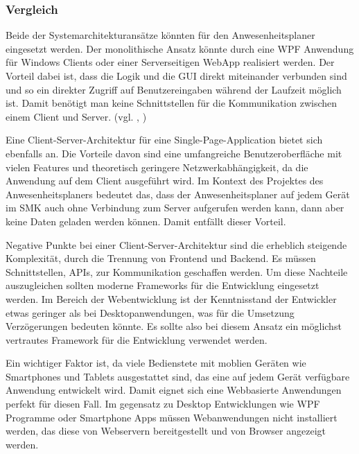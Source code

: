 \subsubsection{Vergleich}
\label{sec:Vergleich}
Beide der Systemarchitekturansätze könnten für den Anwesenheitsplaner eingesetzt werden. Der monolithische Ansatz könnte durch eine WPF Anwendung für Windows Clients oder einer Serverseitigen WebApp realisiert werden. Der Vorteil dabei ist, dass die Logik und die GUI direkt miteinander verbunden sind und so ein direkter Zugriff auf Benutzereingaben während der Laufzeit möglich ist. Damit benötigt man keine Schnittstellen für die Kommunikation zwischen einem Client und Server. (vgl. \cite{wpf}, \cite{modernApp})

Eine Client-Server-Architektur für eine Single-Page-Application bietet sich ebenfalls an. Die Vorteile davon sind eine umfangreiche Benutzeroberfläche mit vielen Features und theoretisch geringere Netzwerkabhängigkeit, da die Anwendung auf dem Client ausgeführt wird. Im Kontext des Projektes des Anwesenheitsplaners bedeutet das, dass der Anwesenheitsplaner auf jedem Gerät im SMK auch ohne Verbindung zum Server aufgerufen werden kann, dann aber keine Daten geladen werden können. Damit entfällt dieser Vorteil.

Negative Punkte bei einer Client-Server-Architektur sind die erheblich steigende Komplexität, durch die Trennung von Frontend und Backend. Es müssen Schnittstellen, \zB APIs, zur Kommunikation geschaffen werden. Um diese Nachteile auszugleichen sollten moderne Frameworks für die Entwicklung eingesetzt werden. Im Bereich der Webentwicklung ist der Kenntnisstand der Entwickler etwas geringer als bei Desktopanwendungen, was für die Umsetzung Verzögerungen bedeuten könnte. Es sollte also bei diesem Ansatz ein möglichst vertrautes Framework für die Entwicklung verwendet werden.

Ein wichtiger Faktor ist, da viele Bedienstete mit moblien Geräten wie Smartphones und Tablets ausgestattet sind, das eine auf jedem Gerät verfügbare Anwendung entwickelt wird. Damit eignet sich eine Webbasierte Anwendungen perfekt für diesen Fall. Im gegensatz zu Desktop Entwicklungen wie WPF Programme oder Smartphone Apps müssen Webanwendungen nicht installiert werden, das diese von Webservern bereitgestellt und von Browser angezeigt werden.

